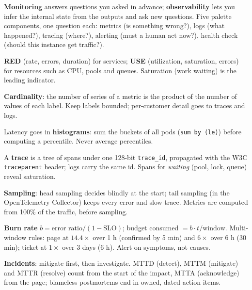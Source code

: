 \stages{\stClarify\ \stEstimate\ \stDeep}

\begin{know}
  \item \textbf{Monitoring} answers questions you asked in advance; \textbf{observability} lets you infer the internal state from the outputs and ask new questions. Five palette components, one question each: metrics (is something wrong?), logs (what happened?), tracing (where?), alerting (must a human act now?), health check (should this instance get traffic?).
  \item \textbf{RED} (rate, errors, duration) for services; \textbf{USE} (utilization, saturation, errors) for resources such as CPU, pools and queues. Saturation (work waiting) is the leading indicator.
  \item \textbf{Cardinality}: the number of series of a metric is the product of the number of values of each label. Keep labels bounded; per-customer detail goes to traces and logs.
  \item Latency goes in \textbf{histograms}: sum the buckets of all pods (\texttt{sum by (le)}) before computing a percentile. Never average percentiles.
  \item A \textbf{trace} is a tree of spans under one 128-bit \texttt{trace\_id}, propagated with the W3C \texttt{traceparent} header; logs carry the same id. Spans for \emph{waiting} (pool, lock, queue) reveal saturation.
  \item \textbf{Sampling}: head sampling decides blindly at the start; tail sampling (in the OpenTelemetry Collector) keeps every error and slow trace. Metrics are computed from 100\% of the traffic, before sampling.
  \item \textbf{Burn rate} $b = \text{error ratio} / (1 - \text{SLO})$; budget consumed $= b \cdot t / \text{window}$. Multi-window rules: page at $14.4\times$ over 1 h (confirmed by 5 min) and $6\times$ over 6 h (30 min); ticket at $1\times$ over 3 days (6 h). Alert on symptoms, not causes.
  \item \textbf{Incidents}: mitigate first, then investigate. MTTD (detect), MTTM (mitigate) and MTTR (resolve) count from the start of the impact, MTTA (acknowledge) from the page; blameless postmortems end in owned, dated action items.
\end{know}

